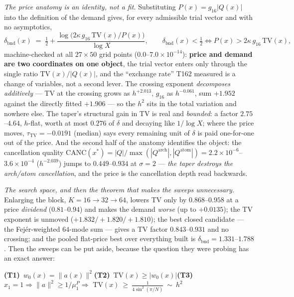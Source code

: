 \documentclass[11pt,a4paper]{article}
\begin{document}
\emph{The price anatomy is an identity, not a fit.} Substituting
$P(x)=g_{16}|Q(x)|$ into the definition of the demand gives, for every
admissible trial vector and with no asymptotics,
\[
\delta_{\mathrm{bnd}}(x)\;=\;\tfrac12+\frac{\log\!\bigl(2\kappa\,g_{16}\,
\mathrm{TV}(x)/P(x)\bigr)}{\log X},\qquad
\delta_{\mathrm{bnd}}(x)<\tfrac12\iff P(x)>2\kappa\,g_{16}\,\mathrm{TV}(x),
\]
machine-checked at all $27\times50$ grid points
($0.0$--$7.0\times10^{-14}$): \textbf{price and demand are two coordinates on
one object}, the trial vector enters only through the single ratio
$\mathrm{TV}(x)/|Q(x)|$, and the ``exchange rate'' T162 measured is a change
of variables, not a second lever. The crossing exponent \emph{decomposes
additively} --- TV at the crossing grows as $h^{+2.013}$, $g_{16}$ as
$h^{-0.061}$, sum $+1.952$ against the directly fitted $+1.906$ --- so the
$h^2$ sits in the total variation and nowhere else. The taper's structural
gain in TV is real and \emph{bounded}: a factor $2.75$--$4.64$, $h$-flat,
worth at most $0.276$ of $\delta$ and decaying like $1/\log X$; where the
price moves, $\tau_{\mathrm{TV}}=-0.0191$ (median) says every remaining unit
of $\delta$ is paid one-for-one out of the price. And the second half of the
anatomy identifies the object: the cancellation quality
$\mathrm{CANC}(x^*)=|Q|/\max(|Q^{\mathrm{arch}}|,|Q^{\mathrm{atom}}|)
=2.2\times10^{-6}$--$3.6\times10^{-4}$ ($h^{-2.039}$) jumps to
$0.449$--$0.934$ at $\sigma=2$ --- \emph{the taper destroys the arch/atom
cancellation}, and the price is the cancellation depth read backwards.

\emph{The search space, and then the theorem that makes the sweeps
unnecessary.} Enlarging the block, $K=16\to32\to64$, lowers TV only by
$0.868$--$0.958$ at a price \emph{dividend} ($0.81$--$0.94$) and makes the
demand \emph{worse} (up to $+0.0135$); the TV exponent is unmoved
($+1.832/+1.820/+1.810$); the best closed candidate --- the Fej\'er-weighted
$64$-mode sum --- gives a TV factor $0.843$--$0.931$ and no crossing; and the
pooled flat-price best over everything built is
$\delta_{\mathrm{bnd}}=1.331$--$1.788$. Then the sweeps can be put aside,
because the question they were probing has an exact answer:

\begin{keyeq}
\textbf{(T1)}\ $w_0(x)=\|a(x)\|^2$\quad\textbf{(T2)}\
$\mathrm{TV}(x)\ge|w_0(x)|$\quad\textbf{(T3)}\ $x_1=1\Rightarrow
\|a\|^2\ge1/\mu^P_1$\quad$\Longrightarrow$\quad
$\displaystyle\mathrm{TV}(x)\ \ge\ \frac1{4\sin^2(\pi/N)}\ \sim\ h^2$
\end{keyeq}
\end{document}
